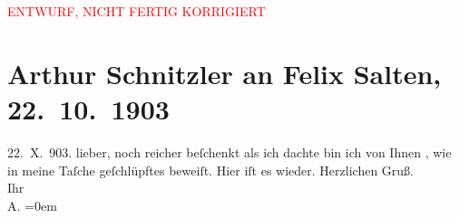 
\begin{center}
            \textcolor{red}{ENTWURF, NICHT FERTIG KORRIGIERT}
                      \end{center}
            
         
         \renewcommand{\erwaehntePersonen}{Personen: Felix Salten}
         \renewcommand{\erwaehnteOrte}{Orte: Wien}
         \renewcommand{\erwaehnteWerke}{}
               \section[Arthur Schnitzler an Felix Salten, 22. 10. 1903]{ Arthur Schnitzler an Felix Salten, 22. 10. 1903}\nopagebreak{}\rehead{ }\begin{ledgroupsized}[t]{13cm}\normalsize\beginnumbering \toendnotes[C]{\smallbreak\pagebreak[2]} 
\toendnotes[C]{\smallbreak}\pstart
           \raggedleft{}{\pb}22. X. 903.\pend
           \pstart
           lieber, noch reicher beſchenkt als ich dachte bin ich von Ihnen
               \label{K_L02987-11v}\label{K_L02987-11h}, wie \label{K_L02987-1v}\label{K_L02987-1h} in meine Taſche geſchlüpftes beweiſt. Hier iſt es
               wieder. \pend
           \pstart
           Herzlichen Gruß. {\\[\baselineskip]}Ihr {\\[\baselineskip]}\spacefill\mbox{A.}\pend
           \leftskip=0em{}
         
         \endnumbering{}\end{ledgroupsized}\begin{anhang}\end{anhang}\newcommand{\dateiname}{L02987}\newcommand{\titel}{Arthur Schnitzler an Felix Salten, 22. 10. 1903}\newcommand{\editorInnen}{Martin Anton Müller und Laura Untner}
      
